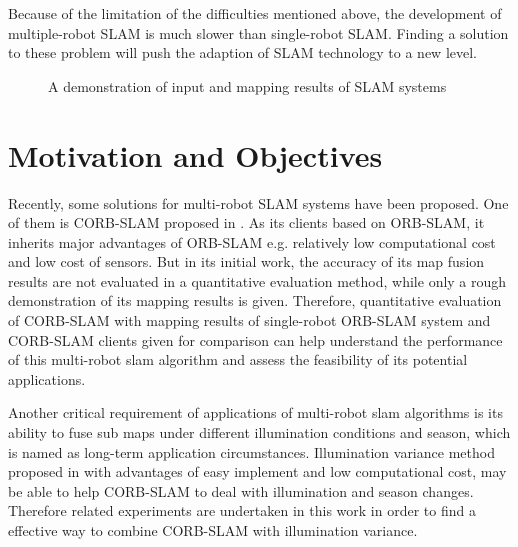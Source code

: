 Because of the limitation of the difficulties mentioned above, the development of multiple-robot SLAM is much slower than single-robot SLAM. Finding a solution to these problem will push the adaption of SLAM technology to a new level.

\begin{figure}
	\centering
	\caption{A demonstration of input and mapping results of SLAM systems}
	\label{fig:backgroundslam}
\end{figure}

\section{Motivation and Objectives}

Recently, some solutions for multi-robot SLAM systems have been proposed. One of them is CORB-SLAM proposed in \cite{li2017corb}. As its clients based on ORB-SLAM, it inherits major advantages of ORB-SLAM e.g. relatively low computational cost and low cost of sensors. But in its initial work, the accuracy of its map fusion results are not evaluated in a quantitative evaluation method, while only a rough demonstration of its mapping results is given. Therefore, quantitative evaluation of CORB-SLAM with mapping results of single-robot ORB-SLAM system and CORB-SLAM clients given for comparison can help understand the performance of this multi-robot slam algorithm and assess the feasibility of its potential applications.

Another critical requirement of applications of multi-robot slam algorithms is its ability to fuse sub maps under different illumination conditions and season, which is named as long-term application circumstances. Illumination variance method proposed in \cite{maddern2014illumination}  with advantages of easy implement and low computational cost, may be able to help CORB-SLAM to deal with illumination and season changes. Therefore related experiments are undertaken in this work in order to find a effective way to combine CORB-SLAM with illumination variance.

